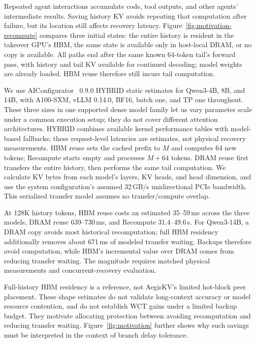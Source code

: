 

Repeated agent interactions accumulate code, tool outputs, and other
agents' intermediate results. Saving history KV avoids repeating that
computation after failure, but its location still affects recovery
latency. Figure~\ref{fig:motivation-recompute} compares three initial
states: the entire history is resident in the takeover GPU's HBM, the
same state is available only in host-local DRAM, or no copy is available.
All paths end after the same known 64-token tail's forward pass, with
history and tail KV available for continued decoding; model weights are
already loaded. HBM reuse therefore still incurs tail computation.

We use AIConfigurator~\cite{nvidia2026aiconfigurator} 0.9.0 HYBRID static
estimates for Qwen3-4B, 8B, and 14B, with A100-SXM, vLLM 0.14.0, BF16,
batch one, and TP one throughout. These three sizes in one supported
dense model family let us vary parameter scale under a common execution
setup; they do not cover different attention architectures.
HYBRID combines available kernel
performance tables with model-based fallbacks; these request-level
latencies are estimates, not physical recovery measurements. HBM reuse
sets the cached prefix to $M$ and computes 64 new tokens; Recompute
starts empty and processes $M+64$ tokens. DRAM reuse first transfers the
entire history, then performs the same tail computation. We calculate
KV bytes from each model's layers, KV heads, and head dimension, and use
the system configuration's assumed 32\,GB/s unidirectional PCIe bandwidth.
This serialized transfer model assumes no transfer/compute overlap.

At 128K history tokens, HBM reuse costs an estimated 35--59\,ms across
the three models, DRAM reuse 639--730\,ms, and Recompute 31.4--49.6\,s.
For Qwen3-14B, a DRAM copy avoids most historical recomputation; full
HBM residency additionally removes about 671\,ms of modeled transfer
waiting. Backups therefore avoid computation, while HBM's incremental
value over DRAM comes from reducing transfer waiting. The magnitude
requires matched physical measurements and concurrent-recovery evaluation.

Full-history HBM residency is a reference, not AegisKV's limited hot-block
peer placement. These shape estimates do not validate long-context
accuracy or model resource contention, and do not establish WCT gains
under a limited backup budget. They motivate allocating protection
between avoiding recomputation and reducing transfer waiting.
Figure~\ref{fig:motivation} further shows why such savings must be
interpreted in the context of branch delay tolerance.

